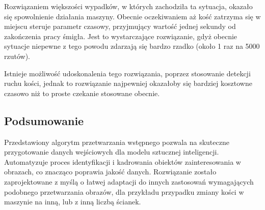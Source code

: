 Rozwiązaniem większości wypadków, w których zachodziła ta sytuacja, okazało się spowolnienie działania maszyny.
Obecnie oczekiwaniem aż kość zatrzyma się w miejscu steruje parametr czasowy, przyjmujący wartość jednej sekundy od zakończenia pracy śmigła.
Jest to wystarczające rozwiązanie, gdyż obecnie sytuacje niepewne z tego powodu zdarzają się bardzo rzadko (około 1 raz na 5000 rzutów).

Istnieje możliwość udoskonalenia tego rozwiązania, poprzez stosowanie detekcji ruchu kości,
jednak to rozwiązanie najpewniej okazałoby się bardziej kosztowne czasowo niż to proste czekanie stosowane obecnie.


\subsection{Podsumowanie}\label{subsec:podsumowanie}

Przedstawiony algorytm przetwarzania wstępnego pozwala na skuteczne przygotowanie danych wejściowych dla modelu sztucznej inteligencji.
Automatyzuje proces identyfikacji i kadrowania obiektów zainteresowania w obrazach, co znacząco poprawia jakość danych.
Rozwiązanie zostało zaprojektowane z myślą o łatwej adaptacji do innych zastosowań wymagających podobnego przetwarzania obrazów,
dla przykładu przypadku zmiany kości w maszynie na inną, lub z inną liczbą ścianek.

